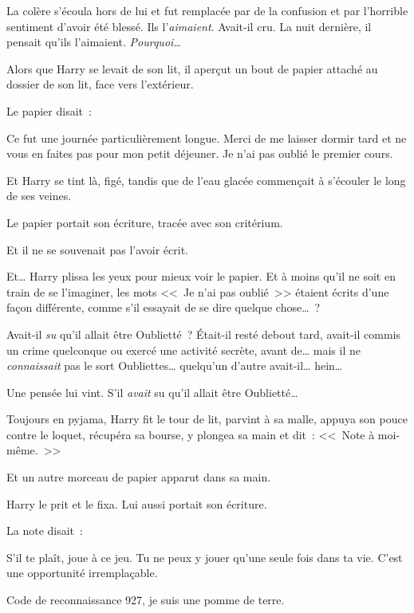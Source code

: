 La colère s'écoula hors de lui et fut remplacée par de la confusion et par l'horrible sentiment d'avoir été blessé. Ils l'\emph{aimaient}. Avait-il cru. La nuit dernière, il pensait qu'ils l'aimaient. \emph{Pourquoi…}

Alors que Harry se levait de son lit, il aperçut un bout de papier attaché au dossier de son lit, face vers l'extérieur.

Le papier disait~:

\begin{writtenNote}

Ce fut une journée particulièrement longue. Merci de me laisser dormir tard et ne vous en faites pas pour mon petit déjeuner. Je n'ai pas oublié le premier cours.

\end{writtenNote}

Et Harry se tint là, figé, tandis que de l'eau glacée commençait à s'écouler le long de ses veines.

Le papier portait son écriture, tracée avec son critérium.

Et il ne se souvenait pas l'avoir écrit.

Et… Harry plissa les yeux pour mieux voir le papier. Et à moins qu'il ne soit en train de se l'imaginer, les mots <<~Je n'ai pas oublié~>> étaient écrits d'une façon différente, comme s'il essayait de se dire quelque chose…~?

Avait-il \emph{su} qu'il allait être Oublietté~? Était-il resté debout tard, avait-il commis un crime quelconque ou exercé une activité secrète, avant de… mais il ne \emph{connaissait} pas le sort Oubliettes… quelqu'un d'autre avait-il… hein…

Une pensée lui vint. S'il \emph{avait} su qu'il allait être Oublietté…

Toujours en pyjama, Harry fit le tour de lit, parvint à sa malle, appuya son pouce contre le loquet, récupéra sa bourse, y plongea sa main et dit~: <<~Note à moi-même.~>>

Et un autre morceau de papier apparut dans sa main.

Harry le prit et le fixa. Lui aussi portait son écriture.

La note disait~:

\begin{writtenNote}

S'il te plaît, joue à ce jeu. Tu ne peux y jouer qu'une seule fois dans ta vie. C'est une opportunité irremplaçable.

Code de reconnaissance 927, je suis une pomme de terre.

\end{writtenNote}

